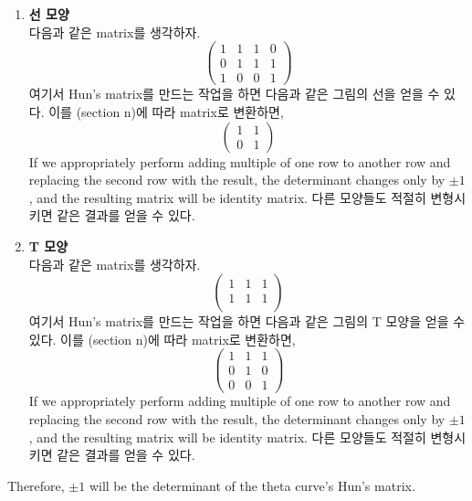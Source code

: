 \documentclass{article}
\begin{document}
\begin{enumerate}
    \item \textbf{선 모양}\\
    다음과 같은 matrix를 생각하자.
    $$\begin{pmatrix}
        1 & 1 & 1 & 0\\
        0 & 1 & 1 & 1\\
        1 & 0 & 0 & 1
    \end{pmatrix}$$
    여기서 Hun's matrix를 만드는 작업을 하면 다음과 같은 그림의 선을 얻을 수 있다.
    이를 (section n)에 따라 matrix로 변환하면,
    $$\begin{pmatrix}
        1 & 1 \\
        0 & 1
    \end{pmatrix}$$
    If we appropriately perform adding multiple of one row to another row and replacing the second row with the result, the determinant changes only by $\pm 1$, and the resulting matrix will be identity matrix. 다른 모양들도 적절히 변형시키면 같은 결과를 얻을 수 있다.
    \item \textbf{T 모양}\\
        다음과 같은 matrix를 생각하자.
    $$\begin{pmatrix}
        1 & 1 & 1\\
        1 & 1 & 1\\
    \end{pmatrix}$$
    여기서 Hun's matrix를 만드는 작업을 하면 다음과 같은 그림의 T 모양을 얻을 수 있다. 이를 (section n)에 따라 matrix로 변환하면,
    $$\begin{pmatrix}
        1 & 1 & 1\\
        0 & 1 & 0\\
        0 & 0 & 1
    \end{pmatrix}$$
    If we appropriately perform adding multiple of one row to another row and replacing the second row with the result, the determinant changes only by $\pm 1$, and the resulting matrix will be identity matrix. 다른 모양들도 적절히 변형시키면 같은 결과를 얻을 수 있다.
\end{enumerate}
Therefore, $\pm 1$ will be the determinant of the theta curve's Hun's matrix.
\end{document}
